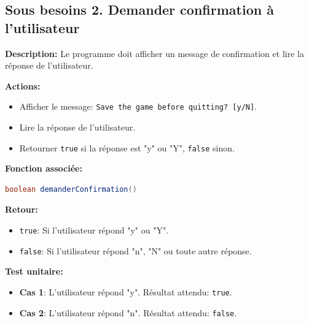 \documentclass[a4paper]{article}
\begin{document}
\subsection*{Sous besoins 2. Demander confirmation à l’utilisateur}
\begin{besoinbox}
\textbf{Description:}
Le programme doit afficher un message de confirmation et lire la réponse de l’utilisateur.

\textbf{Actions:}
\begin{itemize}[leftmargin=2cm]
    \item Afficher le message: \texttt{Save the game before quitting? [y/N]}.
    \item Lire la réponse de l’utilisateur.
    \item Retourner \texttt{true} si la réponse est "y" ou "Y", \texttt{false} sinon.
\end{itemize}

\textbf{Fonction associée:}
\begin{lstlisting}[language=Java]
boolean demanderConfirmation()
\end{lstlisting}

\textbf{Retour:}
\begin{itemize}[leftmargin=2cm]
    \item \texttt{true}: Si l'utilisateur répond "y" ou "Y".
    \item \texttt{false}: Si l'utilisateur répond "n", "N" ou toute autre réponse.
\end{itemize}

\textbf{Test unitaire:}
\begin{itemize}[leftmargin=2cm]
    \item \textbf{Cas 1}: L'utilisateur répond "y". Résultat attendu: \texttt{true}.
    \item \textbf{Cas 2}: L'utilisateur répond "n". Résultat attendu: \texttt{false}.
\end{itemize}
\end{besoinbox}
\end{document}
